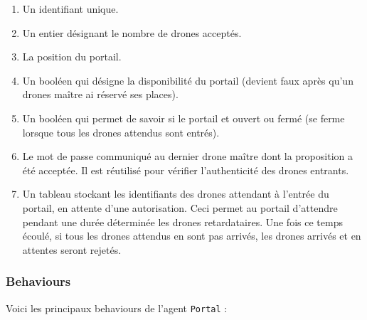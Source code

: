 \documentclass[11pt]{report}
\begin{document}
\begin{enumerate}
\item Un identifiant unique.

\item Un entier désignant le nombre de drones acceptés.

\item La position du portail.

\item Un booléen qui désigne la disponibilité du portail (devient faux après qu'un drones maître ai réservé ses places).

\item Un booléen qui permet de savoir si le portail et ouvert ou fermé (se ferme lorsque tous les drones attendus sont entrés).

\item Le mot de passe communiqué au dernier drone maître dont la proposition a été acceptée. Il est réutilisé pour vérifier l'authenticité des drones entrants.

\item Un tableau stockant les identifiants des drones attendant à l'entrée du portail, en attente d'une autorisation. Ceci permet au portail d'attendre pendant une durée déterminée les drones retardataires. Une fois ce temps écoulé, si tous les drones attendus en sont pas arrivés, les drones arrivés et en attentes seront rejetés.
\end{enumerate}

\subsubsection{Behaviours}

Voici les principaux behaviours de l'agent \verb|Portal| :
\end{document}
